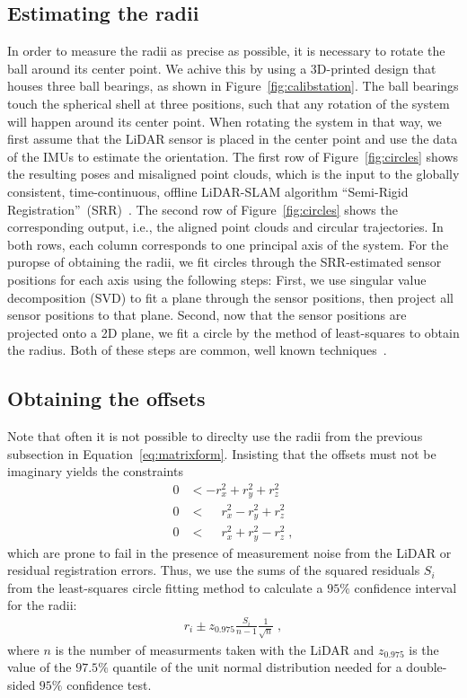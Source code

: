 \subsection{Estimating the radii}
In order to measure the radii as precise as possible, it is necessary to rotate the ball around its center point.
We achive this by using a 3D-printed design that houses three ball bearings, as shown in Figure~\ref{fig:calibstation}.
The ball bearings touch the spherical shell at three positions, such that any rotation of the system will happen around its center point.   
When rotating the system in that way, we first assume that the LiDAR sensor is placed in the center point and use the data of the IMUs to estimate the orientation.  
The first row of Figure~\ref{fig:circles} shows the resulting poses and misaligned point clouds, which is the input to the globally consistent, time-continuous, offline LiDAR-SLAM algorithm ``Semi-Rigid Registration''~(SRR)~\cite{srr}.
The second row of Figure~\ref{fig:circles} shows the corresponding output, i.e., the aligned point clouds and circular trajectories.
In both rows, each column corresponds to one principal axis of the system.
For the puropse of obtaining the radii, we fit circles through the SRR-estimated sensor positions for each axis using the following steps:
First, we use singular value decomposition (SVD) to fit a plane through the sensor positions, then project all sensor positions to that plane.
Second, now that the sensor positions are projected onto a 2D plane, we fit a circle by the method of least-squares to obtain the radius.
Both of these steps are common, well known techniques~\cite{geofit}.

\subsection{Obtaining the offsets}
Note that often it is not possible to direclty use the radii from the previous subsection in Equation~\eqref{eq:matrixform}.
Insisting that the offsets must not be imaginary yields the constraints
\begin{align}
  0 &< -r_x^2 + r_y^2 + r_z^2 \nonumber \\
  0 &< \phantom{-}r_x^2 - r_y^2 + r_z^2 \nonumber \\
  0 &< \phantom{-}r_x^2 + r_y^2 - r_z^2 \;,
\end{align}
which are prone to fail in the presence of measurement noise from the LiDAR or residual registration errors.
Thus, we use the sums of the squared residuals $S_i$ from the least-squares circle fitting method to calculate a $95\%$ confidence interval for the radii:
\begin{align}
  r_i \pm z_{0.975} \frac{S_i}{n-1} \frac{1}{\sqrt{n}} \;,
\end{align}
where $n$ is the number of measurments taken with the LiDAR and $z_{0.975}$ is the value of the $97.5\%$ quantile of the unit normal distribution needed for a double-sided $95\%$ confidence test.


